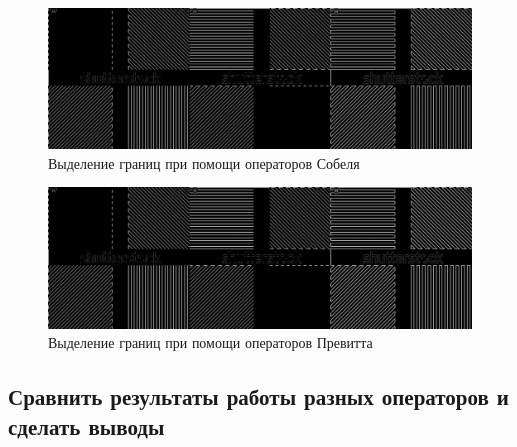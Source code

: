\begin{figure}[H]
	\begin{center}
		\includegraphics[scale=0.25]{Sobel_all_1.jpg}
		\caption{Выделение границ при помощи операторов Собеля} 
		\label{pic:hist_orig} %
	\end{center}
\end{figure}
\begin{figure}[H]
	\begin{center}
		\includegraphics[scale=0.25]{prewit_all_1.jpg}
		\caption{Выделение границ при помощи операторов Превитта} 
		\label{pic:hist_orig} %
	\end{center}
\end{figure}

\subsection{Сравнить результаты работы разных операторов и сделать выводы}

